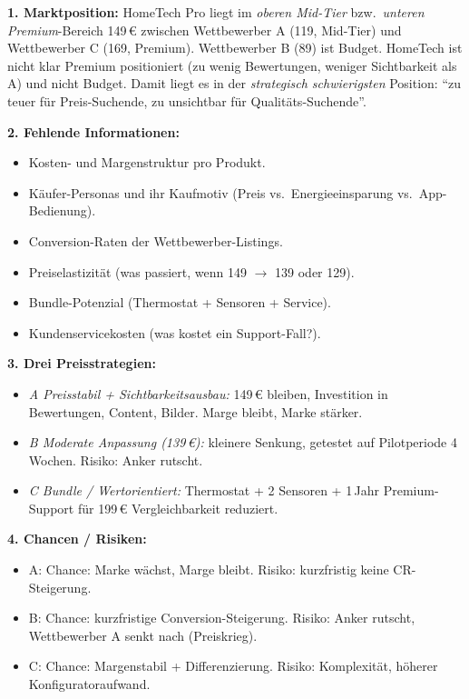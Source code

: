 \documentclass[11pt,a4paper,oneside]{article}
\begin{document}
\begin{loesungbox}
\smallskip
\textbf{1. Marktposition:}
HomeTech Pro liegt im \emph{oberen Mid-Tier} bzw.\ \emph{unteren Premium}-Bereich \textendash{} 149\,\euro{} zwischen Wettbewerber A (119, Mid-Tier) und Wettbewerber C (169, Premium). Wettbewerber B (89) ist Budget. HomeTech ist nicht klar Premium positioniert (zu wenig Bewertungen, weniger Sichtbarkeit als A) und nicht Budget. Damit liegt es in der \emph{strategisch schwierigsten} Position: ``zu teuer für Preis-Suchende, zu unsichtbar für Qualitäts-Suchende''.

\textbf{2. Fehlende Informationen:}
\begin{itemize}
  \item Kosten- und Margenstruktur pro Produkt.
  \item Käufer-Personas und ihr Kaufmotiv (Preis vs.\ Energieeinsparung vs.\ App-Bedienung).
  \item Conversion-Raten der Wettbewerber-Listings.
  \item Preiselastizität (was passiert, wenn 149 $\rightarrow$ 139 oder 129).
  \item Bundle-Potenzial (Thermostat + Sensoren + Service).
  \item Kundenservicekosten (was kostet ein Support-Fall?).
\end{itemize}

\textbf{3. Drei Preisstrategien:}
\begin{itemize}
  \item \emph{A \textendash{} Preisstabil + Sichtbarkeitsausbau:} 149\,\euro{} bleiben, Investition in Bewertungen, Content, Bilder. Marge bleibt, Marke stärker.
  \item \emph{B \textendash{} Moderate Anpassung (139\,\euro):} kleinere Senkung, getestet auf Pilotperiode 4\,Wochen. Risiko: Anker rutscht.
  \item \emph{C \textendash{} Bundle / Wertorientiert:} Thermostat + 2 Sensoren + 1\,Jahr Premium-Support für 199\,\euro{} \textendash{} Vergleichbarkeit reduziert.
\end{itemize}

\textbf{4. Chancen / Risiken:}
\begin{itemize}
  \item A: Chance: Marke wächst, Marge bleibt. Risiko: kurzfristig keine CR-Steigerung.
  \item B: Chance: kurzfristige Conversion-Steigerung. Risiko: Anker rutscht, Wettbewerber A senkt nach (Preiskrieg).
  \item C: Chance: Margenstabil + Differenzierung. Risiko: Komplexität, höherer Konfiguratoraufwand.
\end{itemize}


\end{loesungbox}
\end{document}
